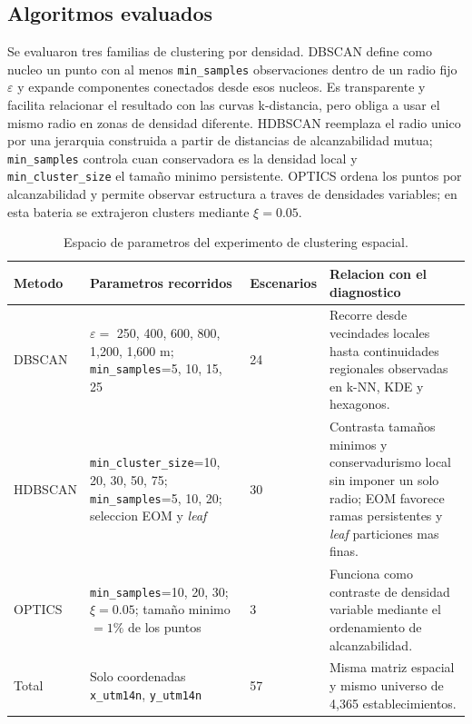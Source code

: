 \documentclass[11pt,letterpaper]{article}
\begin{document}
\subsection{Algoritmos evaluados}

Se evaluaron tres familias de clustering por densidad. DBSCAN define como nucleo un punto con al menos \texttt{min\_samples} observaciones dentro de un radio fijo $\varepsilon$ y expande componentes conectados desde esos nucleos. Es transparente y facilita relacionar el resultado con las curvas k-distancia, pero obliga a usar el mismo radio en zonas de densidad diferente. HDBSCAN reemplaza el radio unico por una jerarquia construida a partir de distancias de alcanzabilidad mutua; \texttt{min\_samples} controla cuan conservadora es la densidad local y \texttt{min\_cluster\_size} el tamaño minimo persistente. OPTICS ordena los puntos por alcanzabilidad y permite observar estructura a traves de densidades variables; en esta bateria se extrajeron clusters mediante $\xi=0.05$.

\begin{table}[H]
\centering
\small
\caption{Espacio de parametros del experimento de clustering espacial.}
\begin{tabularx}{\textwidth}{p{2.2cm}p{5.6cm}p{1.7cm}X}
\toprule
\textbf{Metodo} & \textbf{Parametros recorridos} & \textbf{Escenarios} & \textbf{Relacion con el diagnostico} \\
\midrule
DBSCAN & $\varepsilon=$ 250, 400, 600, 800, 1,200, 1,600 m; \texttt{min\_samples}=5, 10, 15, 25 & 24 & Recorre desde vecindades locales hasta continuidades regionales observadas en k-NN, KDE y hexagonos. \\
HDBSCAN & \texttt{min\_cluster\_size}=10, 20, 30, 50, 75; \texttt{min\_samples}=5, 10, 20; seleccion EOM y \emph{leaf} & 30 & Contrasta tamaños minimos y conservadurismo local sin imponer un solo radio; EOM favorece ramas persistentes y \emph{leaf} particiones mas finas. \\
OPTICS & \texttt{min\_samples}=10, 20, 30; $\xi=0.05$; tamaño minimo $=1\%$ de los puntos & 3 & Funciona como contraste de densidad variable mediante el ordenamiento de alcanzabilidad. \\
\midrule
Total & Solo coordenadas \texttt{x\_utm14n}, \texttt{y\_utm14n} & 57 & Misma matriz espacial y mismo universo de 4,365 establecimientos. \\
\bottomrule
\end{tabularx}
\end{table}
\end{document}
